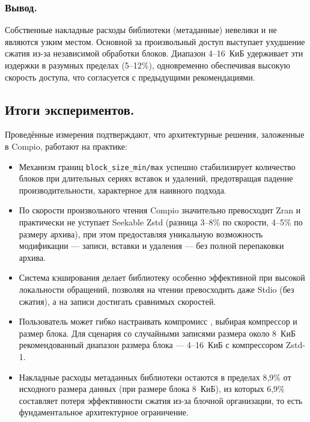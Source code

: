 \subsubsection{Вывод.}
Собственные накладные расходы библиотеки (метаданные) невелики и не являются узким местом. Основной  за произвольный доступ выступает ухудшение сжатия из-за независимой обработки блоков. Диапазон 4--16~КиБ удерживает эти издержки в разумных пределах (5--12\%), одновременно обеспечивая высокую скорость доступа, что согласуется с предыдущими рекомендациями.

\subsection{Итоги экспериментов.}

Проведённые измерения подтверждают, что архитектурные решения, заложенные в Compio, работают на практике:

\begin{itemize}
    \item Механизм границ \texttt{block\_size\_min/max} успешно стабилизирует количество блоков при длительных сериях вставок и удалений, предотвращая падение производительности, характерное для наивного подхода.
    \item По скорости произвольного чтения Compio значительно превосходит Zran и практически не уступает Seekable Zstd (разница 3--8\% по скорости, 4--5\% по размеру архива), при этом предоставляя уникальную возможность модификации --- записи, вставки и удаления --- без полной перепаковки архива.
    \item Система кэширования делает библиотеку особенно эффективной при высокой локальности обращений, позволяя на чтении превосходить даже Stdio (без сжатия), а на записи достигать сравнимых скоростей.
    \item Пользователь может гибко настраивать компромисс , выбирая компрессор и размер блока. Для сценария со случайными записями размера около 8~КиБ рекомендованный диапазон размера блока --- 4--16~КиБ с компрессором Zstd-1.
    \item Накладные расходы метаданных библиотеки остаются в пределах 8,9\% от исходного размера данных (при размере блока 8~КиБ), из которых 6,9\% составляет потеря эффективности сжатия из-за блочной организации, то есть фундаментальное архитектурное ограничение.
\end{itemize}